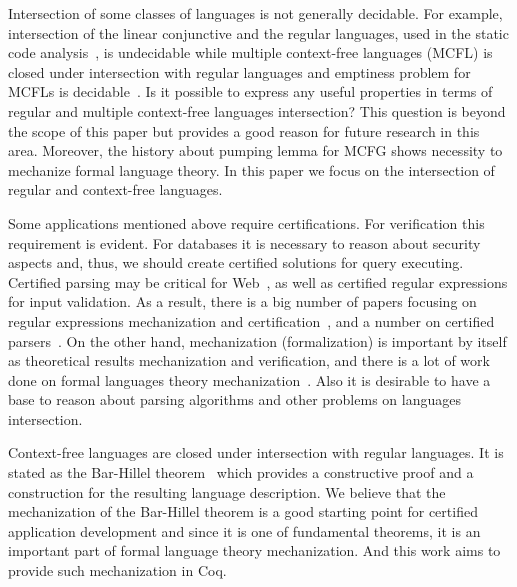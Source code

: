 Intersection of some classes of languages is not generally decidable.
For example, intersection of the linear conjunctive and the regular languages, used in the static code analysis~\cite{zhang2017context}, is undecidable while multiple context-free languages (MCFL) is closed under intersection with regular languages and emptiness problem for MCFLs is decidable~\cite{SEKI1991191}.
Is it possible to express any useful properties in terms of regular and multiple context-free languages intersection?
This question is beyond the scope of this paper but provides a good reason for future research in this area.
Moreover, the history about pumping lemma for MCFG shows necessity to mechanize formal language theory.
In this paper we focus on the intersection of regular and context-free languages.

Some applications mentioned above require certifications.
For verification this requirement is evident.
For databases it is necessary to reason about security aspects and, thus, we should create certified solutions for query executing.
Certified parsing may be critical for Web~\cite{!!!}, as well as certified regular expressions for input validation.
As a result, there is a big number of papers focusing on regular expressions mechanization and certification~\cite{10.1007/978-3-319-03545-1_7}, and a number on certified parsers~\cite{10.1007/978-3-642-00590-9_12,firsov2014certified,Gross2015ParsingPA}.
On the other hand, mechanization (formalization) is important by itself as theoretical results mechanization and verification, and there is a lot of work done on formal languages theory mechanization~\cite{firsov2015certified,ramos2016formalization,1885-16399}.
Also it is desirable to have a base to reason about parsing algorithms and other problems on languages intersection.

Context-free languages are closed under intersection with regular languages.
It is stated as the Bar-Hillel theorem~\cite{bar1961formal} which provides a constructive proof and a construction for the resulting language description.
We believe that the mechanization of the Bar-Hillel theorem is a good starting point for certified application development and since it is one of fundamental theorems, it is an important part of formal language theory mechanization.
And this work aims to provide such mechanization in Coq.

